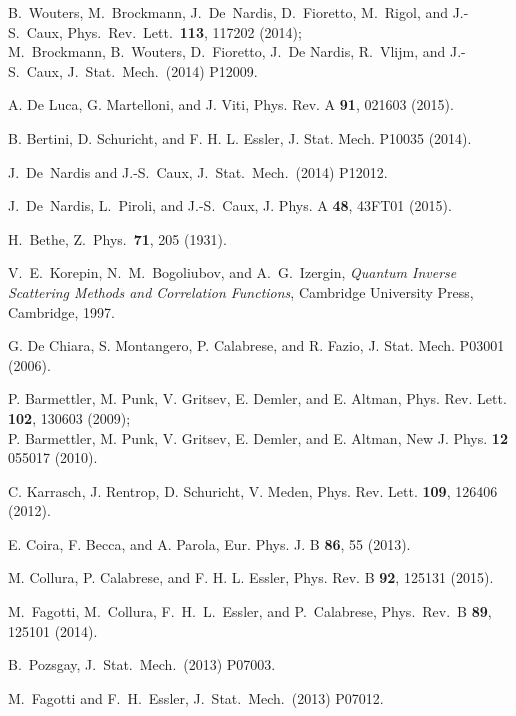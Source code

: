 \documentclass[11pt]{iopart}
\begin{document}
\begin{thebibliography}{99}
B.~Wouters, M.~Brockmann, J.~De~Nardis, D.~Fioretto, M.~Rigol, and J.-S.~Caux, 
Phys.\ Rev.\ Lett.\ {\bf 113}, 117202 (2014);\\ 
M.~Brockmann, B.~Wouters, D.~Fioretto, J.~De Nardis, R.~Vlijm, and J.-S.~Caux, 
J.\ Stat.\ Mech.\ (2014) P12009. 


 A. De Luca, G. Martelloni, and J. Viti,  Phys. Rev. A \textbf{91}, 021603 (2015).


B. Bertini, D. Schuricht, and F. H. L. Essler, J. Stat. Mech.  P10035 (2014).


J.~De~Nardis and J.-S.~Caux, J.\ Stat.\ Mech.\ (2014) P12012.


J.~De~Nardis, L.~Piroli, and J.-S.~Caux, J. Phys. A  {\bf 48}, 43FT01 (2015). 


H.~Bethe, Z.\ Phys.\ {\bf 71}, 205 (1931). 


V.~E.~Korepin, N.~M.~Bogoliubov, and A.~G.~Izergin, \emph{Quantum 
Inverse Scattering Methods and Correlation Functions}, Cambridge 
University Press, Cambridge, 1997. 






G. De Chiara, S. Montangero, P. Calabrese, and R. Fazio,  J. Stat. Mech. P03001 (2006). 


P. Barmettler, M. Punk, V. Gritsev, E. Demler, and E. Altman, 
 Phys. Rev. Lett. {\bf 102}, 130603 (2009);\\
P. Barmettler, M. Punk, V. Gritsev, E. Demler, and E. Altman, 
 New J. Phys. {\bf 12} 055017 (2010).


C. Karrasch, J. Rentrop, D. Schuricht, V. Meden, Phys. Rev. Lett. {\bf 109}, 126406 (2012).


E. Coira, F. Becca, and A. Parola, Eur. Phys. J. B {\bf 86}, 55 (2013).


M. Collura, P. Calabrese, and F. H. L. Essler, Phys. Rev. B {\bf 92}, 125131 (2015).


M.~Fagotti, M.~Collura, F.~H.~L.~Essler, and P.~Calabrese, Phys.\ Rev.\ B {\bf 89}, 125101 (2014).


B.~Pozsgay, J.\ Stat.\ Mech.\ (2013) P07003. 


M.~Fagotti and F.~H.~Essler, J.\ Stat.\ Mech.\ (2013) P07012. 








\end{thebibliography}
\end{document}

